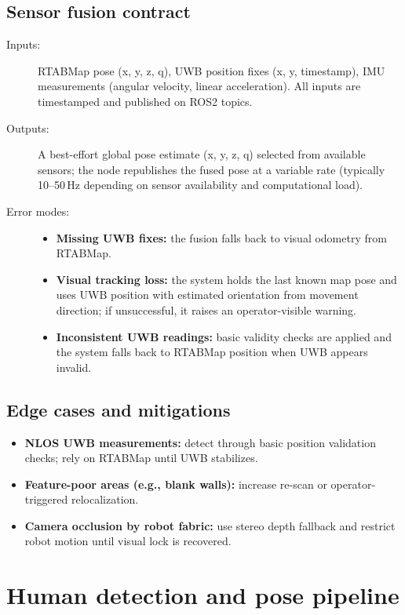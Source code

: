 \subsection*{Sensor fusion contract}
\begin{description}
	\item[Inputs:] RTABMap pose (x, y, z, q), UWB position fixes (x, y, timestamp), IMU measurements (angular velocity, linear acceleration). All inputs are timestamped and published on ROS2 topics.
	\item[Outputs:] A best-effort global pose estimate (x, y, z, q) selected from available sensors; the node republishes the fused pose at a variable rate (typically 10--50\,Hz depending on sensor availability and computational load).
	\item[Error modes:] \begin{itemize}[nosep,leftmargin=*]
		\item \textbf{Missing UWB fixes:} the fusion falls back to visual odometry from RTABMap.
		\item \textbf{Visual tracking loss:} the system holds the last known map pose and uses UWB position with estimated orientation from movement direction; if unsuccessful, it raises an operator-visible warning.
		\item \textbf{Inconsistent UWB readings:} basic validity checks are applied and the system falls back to RTABMap position when UWB appears invalid.
	\end{itemize}
\end{description}

\subsection*{Edge cases and mitigations}
\begin{itemize}
	\item \textbf{NLOS UWB measurements:} detect through basic position validation checks; rely on RTABMap until UWB stabilizes.
	\item \textbf{Feature-poor areas (e.g., blank walls):} increase re-scan or operator-triggered relocalization.
	\item \textbf{Camera occlusion by robot fabric:} use stereo depth fallback and restrict robot motion until visual lock is recovered.
\end{itemize}

\section{Human detection and pose pipeline}


